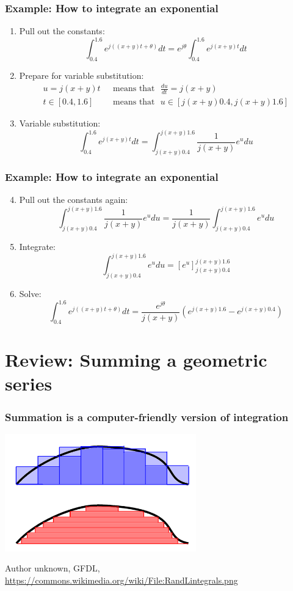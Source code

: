\documentclass{beamer}
\begin{document}
\begin{frame}
  \frametitle{Example: How to integrate an exponential}
  \centerline{}
  \begin{enumerate}
    \item Pull out the constants:
      \[
      \int_{0.4}^{1.6} e^{j((x+y)t+\theta)} dt = e^{j\theta}\int_{0.4}^{1.6} e^{j(x+y)t} dt
      \]
    \item Prepare for variable substitution:
      \begin{align*}
        u = j(x+y)t &~~~\mbox{means that}~~~ \frac{du}{dt} = j(x+y)\\
        t\in[0.4,1.6] &~~~\mbox{means that}~~~ u\in [j(x+y)0.4,j(x+y)1.6]
      \end{align*}
    \item Variable substitution:
      \[
      \int_{0.4}^{1.6} e^{j(x+y)t} dt=\int_{j(x+y)0.4}^{j(x+y)1.6} \frac{1}{j(x+y)}e^{u} du
      \]
  \end{enumerate}
\end{frame}
\begin{frame}
  \frametitle{Example: How to integrate an exponential}
  \begin{enumerate}
    \setcounter{enumi}{3}
  \item Pull out the constants again:
    \[
    \int_{j(x+y)0.4}^{j(x+y)1.6} \frac{1}{j(x+y)}e^{u} du =
    \frac{1}{j(x+y)}  \int_{j(x+y)0.4}^{j(x+y)1.6} e^{u} du
    \]
  \item Integrate:
    \[
    \int_{j(x+y)0.4}^{j(x+y)1.6} e^{u} du=
    \left[e^u\right]_{j(x+y)0.4}^{j(x+y)1.6}
    \]
  \item Solve:
    \[
    \int_{0.4}^{1.6} e^{j((x+y)t+\theta)} dt =
    \frac{e^{j\theta}}{j(x+y)}\left(e^{j(x+y)1.6}-e^{j(x+y)0.4}\right)
    \]
  \end{enumerate}
\end{frame}

\section[Summation]{Review: Summing a geometric series}
\setcounter{subsection}{1}

\begin{frame}
  \frametitle{Summation is a computer-friendly version of integration}
  \centerline{\includegraphics[height=2in]{fig2.png}}
  \begin{tiny}
  Author unknown, GFDL,
  \url{https://commons.wikimedia.org/wiki/File:RandLintegrals.png}
  \end{tiny}
\end{frame}
\end{document}
